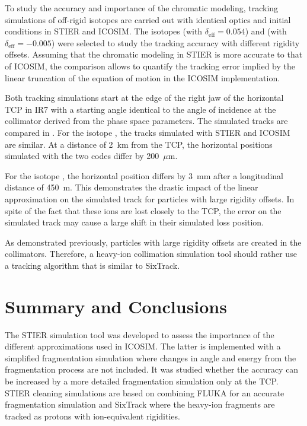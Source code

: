 To study the accuracy and importance of the chromatic modeling, tracking simulations of off-rigid isotopes are carried out with identical optics and initial conditions in STIER and ICOSIM. The isotopes  (with $\delta_\text{eff} = 0.054$) and  (with $\delta_\text{eff} = -0.005$) were selected to study the tracking accuracy with different rigidity offsets. Assuming that the chromatic modeling in STIER is more accurate to that of ICOSIM, the comparison allows to quantify the tracking error implied by the linear truncation of the equation of motion in the ICOSIM implementation. 

Both tracking simulations start at the edge of the right jaw of the horizontal TCP in IR7 with a starting angle identical to the angle of incidence at the collimator derived from the phase space parameters. The simulated tracks are compared in . For the isotope , the tracks simulated with STIER and ICOSIM are similar. At a distance of 2~km from the TCP, the horizontal positions simulated with the two codes differ by 200~$\mu$m. 

For the isotope , the horizontal position differs by 3~mm after a longitudinal distance of 450~m. This demonstrates the drastic impact of the linear approximation on the simulated track for particles with large rigidity offsets. In spite of the fact that these ions are lost closely to the TCP, the error on the simulated track may cause a large shift in their simulated loss position. 

As demonstrated previously, particles with large rigidity offsets are created in the collimators. Therefore, a heavy-ion collimation simulation tool should rather use a tracking algorithm that is similar to SixTrack.




\section{Summary and Conclusions}


The STIER simulation tool was developed to assess the importance of the different approximations used in ICOSIM. The latter is implemented with a simplified fragmentation simulation where changes in angle and energy from the fragmentation process are not included. It was studied whether the accuracy can be increased by a more detailed fragmentation simulation only at the TCP. STIER cleaning simulations are  based on combining FLUKA for an accurate fragmentation simulation and SixTrack where the heavy-ion fragments are tracked as protons with ion-equivalent rigidities. 

